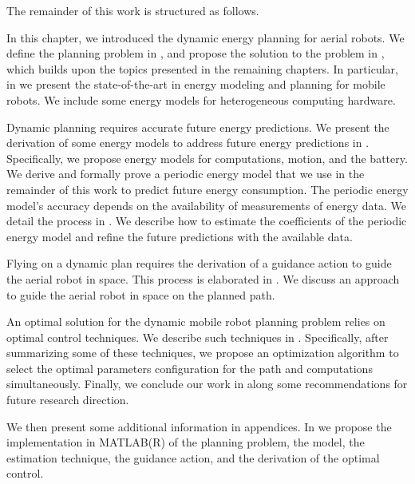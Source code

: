 The remainder of this work is structured as follows.

In this chapter, we introduced the dynamic energy planning for aerial robots. We define the planning problem in , and propose the solution to the problem in , which builds upon the topics presented in the remaining chapters. In particular, in  we present the state-of-the-art in energy modeling and planning for mobile robots. We include some energy models for heterogeneous computing hardware.

Dynamic planning requires accurate future energy predictions. We present the derivation of some energy models to address future energy predictions in . Specifically, we propose energy models for computations, motion, and the battery. We derive and formally prove a periodic energy model that we use in the remainder of this work to predict future energy consumption. The periodic energy model's accuracy depends on the availability of measurements of energy data. We detail the process in . We describe how to estimate the coefficients of the periodic energy model and refine the future predictions with the available data.

Flying on a dynamic plan requires the derivation of a guidance action to guide the aerial robot in space. This process is elaborated in . We discuss an approach to guide the aerial robot in space on the planned path. 

An optimal solution for the dynamic mobile robot planning problem relies on optimal control techniques. We describe such techniques in . Specifically, after summarizing some of these techniques, we propose an optimization algorithm to select the optimal parameters configuration for the path and computations simultaneously. Finally, we conclude our work in  along some recommendations for future research direction. 

We then present some additional information in appendices. In  we propose the implementation in MATLAB(R) of the planning problem, the model, the estimation technique, the guidance action, and the derivation of the optimal control. 

